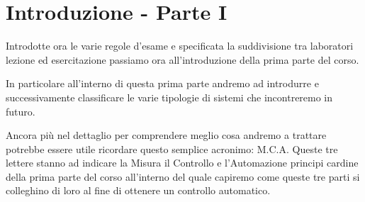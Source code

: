 \documentclass[../main.tex]{subfiles}
\begin{document}
\clearpage
\thispagestyle{empty}

\vspace*{7cm}
\section{Introduzione - Parte I}
\vspace*{1.5cm}


Introdotte ora le varie regole d'esame e specificata la suddivisione tra laboratori lezione ed esercitazione passiamo ora all'introduzione della prima parte del corso.

In particolare all'interno di questa prima parte andremo ad introdurre e successivamente classificare le varie tipologie di sistemi che incontreremo in futuro.

Ancora più nel dettaglio per comprendere meglio cosa andremo a trattare potrebbe essere utile ricordare questo semplice acronimo: M.C.A.
Queste tre lettere stanno ad indicare la Misura il Controllo e l'Automazione principi cardine della prima parte del corso all'interno del quale capiremo come queste tre parti si colleghino di loro al fine di ottenere un controllo automatico.
\end{document}
